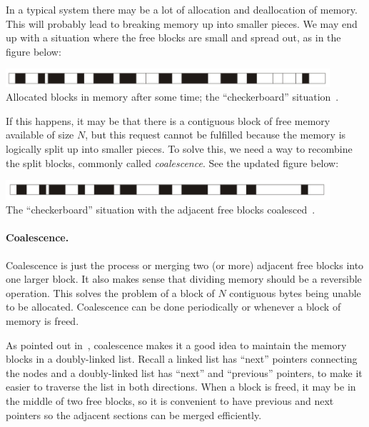 In a typical system there may be a lot of allocation and deallocation of memory. This will probably lead to breaking memory up into smaller pieces. We may end up with a situation where the free blocks are small and spread out, as in the figure below: 

\begin{center}
\includegraphics[width=0.9\textwidth]{images/checkerboard.png}\\
Allocated blocks in memory after some time; the ``checkerboard'' situation~\cite{mte241}.
\end{center}

If this happens, it may be that there is a contiguous block of free memory available of size $N$, but this request cannot be fulfilled because the memory is logically split up into smaller pieces. To solve this, we need a way to recombine the split blocks, commonly called \textit{coalescence}. See the updated figure below:

\begin{center}
\includegraphics[width=0.9\textwidth]{images/checkerboard-coalesced.png}\\
The ``checkerboard'' situation with the adjacent free blocks coalesced~\cite{mte241}.
\end{center}

\paragraph{Coalescence.} Coalescence is just the process or merging two (or more) adjacent free blocks into one larger block. It also makes sense that dividing memory should be a reversible operation. This solves the problem of a block of $N$ contiguous bytes being unable to be allocated. Coalescence can be done periodically or whenever a block of memory is freed.

As pointed out in~\cite{mte241}, coalescence makes it a good idea to maintain the memory blocks in a doubly-linked list. Recall a linked list has ``next'' pointers connecting the nodes and a doubly-linked list has ``next'' and ``previous'' pointers, to make it easier to traverse the list in both directions. When a block is freed, it may be in the middle of two free blocks, so it is convenient to have previous and next pointers so the adjacent sections can be merged efficiently.

